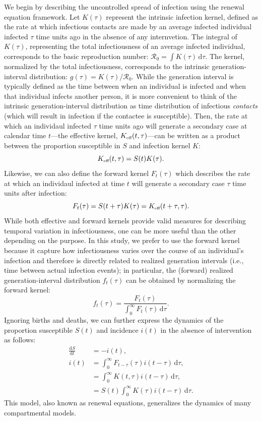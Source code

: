 \documentclass[12pt]{article}
\newcommand{\Rx}[1]{\ensuremath{{\mathcal R}_{#1}}\xspace}
\newcommand{\Ro}{\Rx{0}}
\newcommand{\tsub}[2]{#1_{{\textrm{\tiny #2}}}}
\newcommand{\dd}[1]{\ensuremath{\, \mathrm{d}#1}}
\newcommand{\dtau}{\dd{\tau}}
\newcommand{\Keff}{\ensuremath{\tsub{K}{eff}}\xspace}
\begin{document}
We begin by describing the uncontrolled spread of infection using the renewal equation framework.
Let $K(\tau)$ represent the intrinsic infection kernel, defined as the rate at which infectious contacts are made by an average infected individual infected $\tau$ time units ago in the absence of any internvetion.
The integral of $K(\tau)$, representing the total infectiousness of an average infected individual, corresponds to the basic reproduction number: $\Ro = \int K(\tau) \dtau$.
The kernel, normalized by the total infectiousness, corresponds to the intrinsic generation-interval distribution: $g(\tau) = K(\tau)/\Ro$.
While the generation interval is typically defined as the time between when an individual is infected and when that individual infects another person, it is more convenient to think of the intrinsic generation-interval distribution as time distribution of infectious \emph{contacts} (which will result in infection if the contactee is susceptible).
Then, the rate at which an individaul infected $\tau$ time units ago will generate a secondary case at calendar time $t$---the effective kernel, $\Keff(t,\tau)$---can be written as a product between the proportion susceptible in $S$ and infection kernel $K$:
\begin{equation}
\Keff(t,\tau) = S(t) K(\tau).
\end{equation}
Likewise, we can also define the forward kernel $F_t(\tau)$ which describes the rate at which an individaul infected at time $t$ will generate a secondary case $\tau$ time units after infection:
\begin{equation}
F_t(\tau) = S(t+\tau) K(\tau) = \Keff(t+\tau,\tau).
\end{equation}
While both effective and forward kernels provide valid measures for describing temporal variation in infectiousness, one can be more useful than the other depending on the purpose.
In this study, we prefer to use the forward kernel because it capture how infectiousness varies over the course of an individual's infection and therefore is directly related to realized generation intervals (i.e., time between actual infection events);
in particular, the (forward) realized generation-interval distribution $f_t(\tau)$ can be obtained by normalizing the forward kernel:
\begin{equation}
f_t(\tau) = \frac{F_t(\tau)}{\int_0^\infty F_t(\tau) \dtau}.
\end{equation}
Ignoring births and deaths, we can further express the dynamics of the proportion susceptible $S(t)$ and incidence $i(t)$ in the absence of intervention as follows:
\begin{align}
\frac{\mathrm{d}S}{\mathrm{d}t} &= - i(t),\\
i(t) &= \int_0^\infty F_{t-\tau}(\tau) i(t-\tau) \dtau,\\
&=\int_0^\infty K(t,\tau) i(t-\tau) \dtau,\\
&= S(t) \int_0^\infty K(\tau) i(t-\tau) \dtau.
\end{align}
This model, also known as renewal equations, generalizes the dynamics of many compartmental models.
\end{document}
